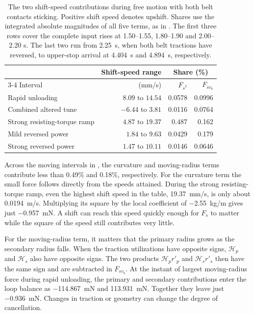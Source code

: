 \documentclass[11pt]{report}
\numberwithin{equation}{section}
\begin{document}
\begin{table}[H]
 \centering\small
 \setlength{\tabcolsep}{6pt}\renewcommand{\arraystretch}{1.2}
 \begin{tabular}{@{}lrrr@{}}
 \toprule
 & Shift-speed range & \multicolumn{2}{c}{Share (\%)} \\
 \cmidrule(l){3-4}
 Interval & (\si{mm/s}) & \(F_{\dot s^2}\) & \(F_{\dot s v_b}\) \\
 \midrule
 Rapid unloading & $8.09$ to $14.54$ & 0.0578 & 0.0996 \\
 Combined altered tune & $-6.44$ to $3.81$ & 0.0116 & 0.0764 \\
 Strong resisting-torque ramp & $4.87$ to $19.37$ & 0.487 & 0.162 \\
 Mild reversed power & $1.84$ to $9.63$ & 0.0429 & 0.179 \\
 Strong reversed power & $1.47$ to $10.11$ & 0.0146 & 0.0646 \\
 \bottomrule
 \end{tabular}
 \caption{The two shift-speed contributions during free motion with both
 belt contacts sticking. Positive shift speed denotes upshift. Shares use
 the integrated absolute magnitudes of all five terms, as in
 . The first three rows cover the complete
 input rises at 1.50--1.55, 1.80--1.90 and 2.00--2.20 s. The last two run
 from \SI{2.25}{s}, when both belt tractions have reversed, to upper-stop
 arrival at \SI{4.404}{s} and \SI{4.894}{s}, respectively.}
 \label{tab:results_belt_moving_terms}
\end{table}

Across the moving intervals in ,
the curvature and moving-radius terms contribute less than 0.49\% and
0.18\%, respectively. For the curvature term the small force follows
directly from the speeds attained. During the strong resisting-torque
ramp, even the highest shift speed in the table, \SI{19.37}{mm/s}, is
only about \SI{0.0194}{m/s}. Multiplying its square by the local
coefficient of \SI{-2.55}{kg/m} gives just \SI{-0.957}{mN}. A shift
can reach this speed quickly enough for \(F_{\ddot s}\) to matter while
the square of the speed still contributes very little.

For the moving-radius term, it matters that the primary radius grows as
the secondary radius falls. When the traction utilizations have opposite
signs, \(\mathcal H_p\) and \(\mathcal H_s\) also have opposite signs.
The two products \(\mathcal H_pr'_p\) and \(\mathcal H_sr'_s\) then have
the same sign and are subtracted in \(F_{\dot s v_b}\).
At the instant of largest moving-radius force during rapid unloading,
the primary and secondary contributions enter the loop balance as
\SI{-114.867}{mN} and \SI{+113.931}{mN}. Together they leave just
\SI{-0.936}{mN}. Changes in traction or geometry can change the degree
of cancellation.
\end{document}
